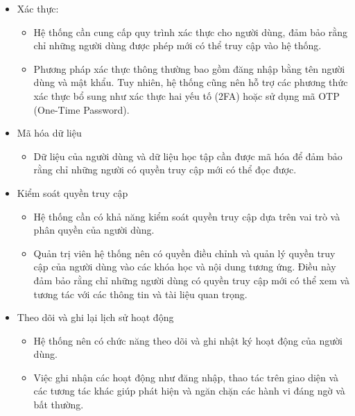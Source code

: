 \documentclass[../Thesis.tex]{subfiles}
\begin{document}
            \begin{itemize}
                \item Xác thực:
                    \begin{itemize}
                        \item Hệ thống cần cung cấp quy trình xác thực cho người dùng, đảm bảo rằng chỉ những người dùng được phép mới có thể truy cập vào hệ thống.
                        \item Phương pháp xác thực thông thường bao gồm đăng nhập bằng tên người dùng và mật khẩu. Tuy nhiên, hệ thống cũng nên hỗ trợ các phương thức xác thực bổ sung như xác thực hai yếu tố (2FA) hoặc sử dụng mã OTP (One-Time Password).
                    \end{itemize}

                \item Mã hóa dữ liệu
                    \begin{itemize}
                        \item Dữ liệu của người dùng và dữ liệu học tập cần được mã hóa để đảm bảo rằng chỉ những người có quyền truy cập mới có thể đọc được.
                    \end{itemize}

                \item Kiểm soát quyền truy cập
                \begin{itemize}
                    \item Hệ thống cần có khả năng kiểm soát quyền truy cập dựa trên vai trò và phân quyền của người dùng.
                    
                    \item Quản trị viên hệ thống nên có quyền điều chỉnh và quản lý quyền truy cập của người dùng vào các khóa học và nội dung tương ứng. Điều này đảm bảo rằng chỉ những người dùng có quyền truy cập mới có thể xem và tương tác với các thông tin và tài liệu quan trọng.
                \end{itemize}

                \item Theo dõi và ghi lại lịch sử hoạt động
                \begin{itemize}
                    \item Hệ thống nên có chức năng theo dõi và ghi nhật ký hoạt động của người dùng.
                    
                    \item Việc ghi nhận các hoạt động như đăng nhập, thao tác trên giao diện và các tương tác khác giúp phát hiện và ngăn chặn các hành vi đáng ngờ và bất thường.
                \end{itemize}
            \end{itemize}
    
\end{document}
